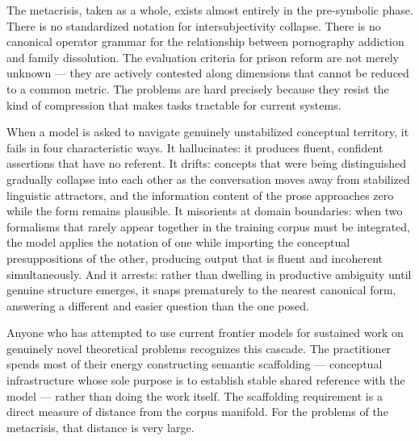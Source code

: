 \documentclass[12pt, a4paper]{article}
\theoremstyle{remark}
\begin{document}
The metacrisis, taken as a whole, exists almost entirely in the pre-symbolic phase. There is no standardized notation for intersubjectivity collapse. There is no canonical operator grammar for the relationship between pornography addiction and family dissolution. The evaluation criteria for prison reform are not merely unknown --- they are actively contested along dimensions that cannot be reduced to a common metric. The problems are hard precisely because they resist the kind of compression that makes tasks tractable for current systems.

\begin{center}
\end{center}

When a model is asked to navigate genuinely unstabilized conceptual territory, it fails in four characteristic ways. It hallucinates: it produces fluent, confident assertions that have no referent. It drifts: concepts that were being distinguished gradually collapse into each other as the conversation moves away from stabilized linguistic attractors, and the information content of the prose approaches zero while the form remains plausible. It misorients at domain boundaries: when two formalisms that rarely appear together in the training corpus must be integrated, the model applies the notation of one while importing the conceptual presuppositions of the other, producing output that is fluent and incoherent simultaneously. And it arrests: rather than dwelling in productive ambiguity until genuine structure emerges, it snaps prematurely to the nearest canonical form, answering a different and easier question than the one posed.

Anyone who has attempted to use current frontier models for sustained work on genuinely novel theoretical problems recognizes this cascade. The practitioner spends most of their energy constructing semantic scaffolding --- conceptual infrastructure whose sole purpose is to establish stable shared reference with the model --- rather than doing the work itself. The scaffolding requirement is a direct measure of distance from the corpus manifold. For the problems of the metacrisis, that distance is very large.
\end{document}
